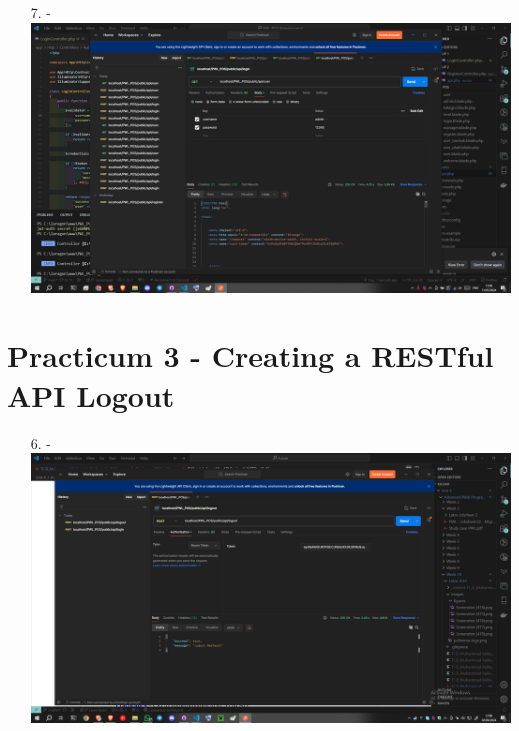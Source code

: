 \documentclass[12pt,titlepage]{article}
\begin{document}
\begin{enumerate}
    \item[7.] - \\ \includegraphics[width=.9\textwidth]{images/figures/Screenshot (478).png}
\end{enumerate}
\section{Practicum 3 - Creating a RESTful API Logout}
\begin{enumerate}
    \item[6.] - \\ \includegraphics[width=.9\textwidth]{images/figures/Screenshot (472).png}
\end{enumerate}
\end{document}
